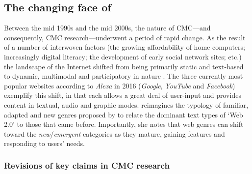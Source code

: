 \subsection{The changing face of }

Between the mid 1990s and the mid 2000s, the nature of \gls{CMC}---and consequently, \gls{CMC} research---underwent a period of rapid change. As the result of a number of interwoven factors (the growing affordability of home computers; increasingly digital literacy; the development of early social network sites; etc.) the landscape of the Internet shifted from being primarily static and text\hyp{}based to dynamic, multimodal and participatory in nature \cite{herring_discourse_2011,lindholm_identity_2012}. The three currently most popular websites according to \emph{Alexa} in 2016 (\emph{Google}, \emph{YouTube} and \emph{Facebook}) exemplify this shift, in that each allows a great deal of user\hyp{}input and provides content in textual, audio and graphic modes. \textcite{herring_discourse_2011} reimagines the typology of familiar, adapted and new genres proposed by \textcite{crowston_reproduced_2000} to relate the dominant text types of `Web 2.0' to those that came before. Importantly, she notes that web genres can shift toward the \emph{new}\slash \emph{emergent} categories as they mature, gaining features and responding to users' needs.

\subsubsection{Revisions of key claims in CMC research}


